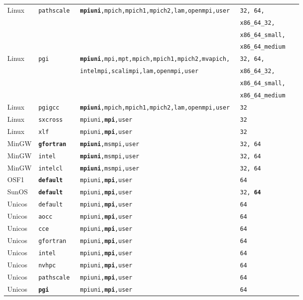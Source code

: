 \begin{longtable}{lllll}
Linux   &\tt pathscale            &\footnotesize \tt {\bf mpiuni},mpich,mpich1,mpich2,lam,openmpi,user &\tt 32, 64, \\
        &                         &                              &\tt x86\_64\_32, \\
        &                         &                              &\tt x86\_64\_small, \\
        &                         &                              &\tt x86\_64\_medium \\
Linux   &\tt pgi                  &\footnotesize \tt {\bf mpiuni},mpi,mpt,mpich,mpich1,mpich2,mvapich, &\tt 32, 64, \\
        &                         &\footnotesize \tt intelmpi,scalimpi,lam,openmpi,user &\tt x86\_64\_32, \\
        &                         &                              &\tt x86\_64\_small, \\
        &                         &                              &\tt x86\_64\_medium \\
Linux   &\tt pgigcc               &\footnotesize \tt {\bf mpiuni},mpich,mpich1,mpich2,lam,openmpi,user &\tt 32 \\
Linux   &\tt sxcross              &\footnotesize \tt mpiuni,{\bf mpi},user      &\tt 32  \\
Linux   &\tt xlf                  &\footnotesize \tt mpiuni,{\bf mpi},user      &\tt 32  \\
MinGW   &\tt {\bf gfortran}       &\footnotesize \tt {\bf mpiuni},msmpi,user    &\tt 32, 64 \\
MinGW   &\tt intel                &\footnotesize \tt {\bf mpiuni},msmpi,user    &\tt 32, 64 \\
MinGW   &\tt intelcl              &\footnotesize \tt {\bf mpiuni},msmpi,user    &\tt 32, 64 \\
OSF1    &\tt {\bf default}        &\footnotesize \tt mpiuni,{\bf mpi},user      &\tt 64  \\
SunOS   &\tt {\bf default}        &\footnotesize \tt mpiuni,{\bf mpi},user      &\tt 32, {\bf 64} \\
Unicos  &\tt default              &\footnotesize \tt mpiuni,{\bf mpi},user      &\tt 64  \\
Unicos  &\tt aocc                 &\footnotesize \tt mpiuni,{\bf mpi},user      &\tt 64  \\
Unicos  &\tt cce                  &\footnotesize \tt mpiuni,{\bf mpi},user      &\tt 64  \\
Unicos  &\tt gfortran             &\footnotesize \tt mpiuni,{\bf mpi},user      &\tt 64  \\
Unicos  &\tt intel                &\footnotesize \tt mpiuni,{\bf mpi},user      &\tt 64  \\
Unicos  &\tt nvhpc                &\footnotesize \tt mpiuni,{\bf mpi},user      &\tt 64  \\
Unicos  &\tt pathscale            &\footnotesize \tt mpiuni,{\bf mpi},user      &\tt 64  \\
Unicos  &\tt {\bf pgi}            &\footnotesize \tt mpiuni,{\bf mpi},user      &\tt 64

\end{longtable}
